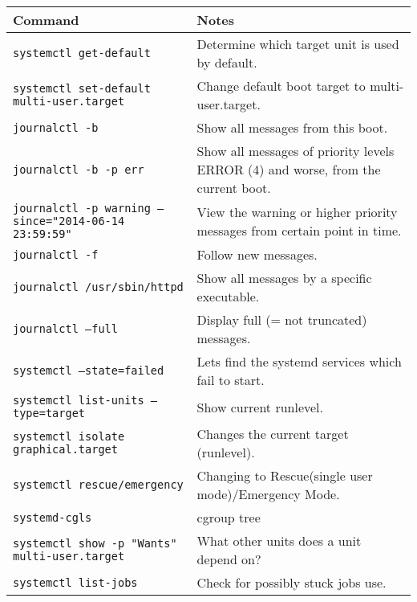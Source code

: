 \documentclass[a4paper]{article}
\begin{document}
\begin{center}
\vspace{6mm}

\begin{tabularx}{\textwidth}{ |l|X| }
\hline
\rowcolor[gray]{.8}
\bfseries Command                                       & \bfseries Notes \\\hline
\tt systemctl get-default                               & Determine which target unit is used by default. \\\hline
\tt systemctl set-default multi-user.target             & Change default boot target to multi-user.target. \\\hline
\tt journalctl -b                                       & Show all messages from this boot. \\\hline
\tt journalctl -b -p err                                & Show all messages of priority levels ERROR (4) and worse, from the current boot. \\\hline
\tt journalctl -p warning --since="2014-06-14 23:59:59" &  View the warning or higher priority messages from certain point in time. \\\hline
\tt journalctl -f                                       & Follow new messages. \\\hline
\tt journalctl /usr/sbin/httpd                          & Show all messages by a specific executable. \\\hline
\tt journalctl --full                                   & Display full (= not truncated) messages. \\\hline
\tt systemctl --state=failed                            & Lets find the systemd services which fail to start. \\\hline
\tt systemctl list-units --type=target                  & Show current runlevel. \\\hline
\tt systemctl isolate graphical.target                  & Changes the current target (runlevel). \\\hline
\tt systemctl rescue/emergency                          & Changing to Rescue(single user mode)/Emergency Mode. \\\hline
\tt systemd-cgls                                        & cgroup tree \\\hline
\tt systemctl show -p "Wants" multi-user.target         & What other units does a unit depend on? \\\hline
\tt systemctl list-jobs                                 & Check for possibly stuck jobs use. \\\hline
\end{tabularx}


\end{center}
\end{document}
